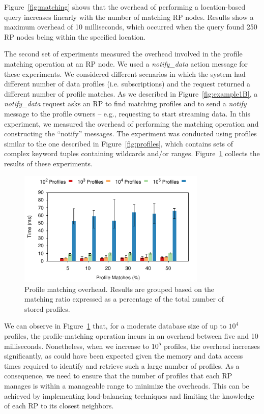 Figure~\ref{fig:matching} shows that the overhead of performing a location-based query increases linearly with the number of matching RP nodes. Results show a maximum overhead of 10 milliseconds, which occurred when the query found 250 RP nodes being within the specified location.

The second set of experiments measured the overhead involved in the profile matching operation at an RP node. We used a {\it notify\_data} action message for these experiments. We considered different scenarios in which the system had different number of data profiles (i.e. subscriptions) and the request returned a different number of profile matches. As we described in Figure~\ref{fig:example1B}, a {\it notify\_data} request asks an RP to find matching profiles and to send a {\it notify} message to the profile owners -- e.g., requesting to start streaming data. In this experiment, we measured the overhead of performing the matching operation and constructing the ``notify'' messages.  The experiment was conducted using profiles similar to the one described in Figure~\ref{fig:profiles}, which contains sets of complex keyword tuples containing wildcards and/or ranges. Figure~\ref{fig:profileQuery} collects the results of these experiments. 

\begin{figure}[htb!]
  \centering
    \includegraphics[width=0.8\textwidth]{Figures/profileQuery.pdf}
  \caption{Profile matching overhead. Results are grouped based on the matching ratio expressed as a percentage of the total number of stored profiles.} \label{fig:profileQuery}
\end{figure}

We can observe in Figure~\ref{fig:profileQuery} that, for a moderate database size of up to $10^4$ profiles, the profile-matching operation incurs in an overhead between five and 10 milliseconds. Nonetheless, when we increase to $10^5$ profiles, the overhead increases significantly, as could have been expected given the memory and data access times required to identify and retrieve such a large number of profiles. As a consequence, we need to ensure that the number of profiles that each RP manages is within a manageable range to minimize the overheads. This can be achieved by implementing load-balancing techniques and limiting the knowledge of each RP to its closest neighbors. 

